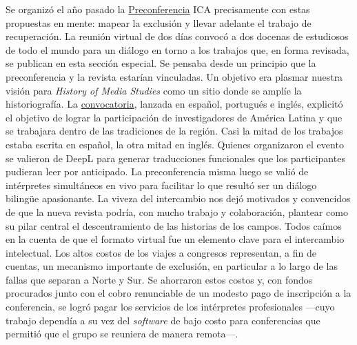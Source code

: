 \documentclass{tufte-handout}
\begin{document}
Se organizó el año pasado la
\href{https://hms.mediastudies.press/pub/schedule/}{Preconferencia} ICA
precisamente con estas propuestas en mente: mapear la exclusión y llevar
adelante el trabajo de recuperación. La reunión virtual de dos días
convocó a dos docenas de estudiosos de todo el mundo para un diálogo en
torno a los trabajos que, en forma revisada, se publican en esta sección
especial. Se pensaba desde un principio que la preconferencia y la
revista estarían vinculadas. Un objetivo era plasmar nuestra visión para
\emph{History of Media Studies} como un sitio donde se amplíe la
historiografía. La
\href{https://hms.mediastudies.press/pub/precon-cfp/}{convocatoria},
lanzada en español, portugués e inglés, explicitó el objetivo de lograr
la participación de investigadores de América Latina y que se trabajara
dentro de las tradiciones de la región. Casi la mitad de los trabajos
estaba escrita en español, la otra mitad en inglés. Quienes organizaron
el evento se valieron de DeepL para generar traducciones funcionales que
los participantes pudieran leer por anticipado. La preconferencia misma
luego se valió de intérpretes simultáneos en vivo para facilitar lo que
resultó ser un diálogo bilingüe apasionante. La viveza del intercambio
nos dejó motivados y convencidos de que la nueva revista podría, con
mucho trabajo y colaboración, plantear como su pilar central el
descentramiento de las historias de los campos. Todos caímos en la
cuenta de que el formato virtual fue un elemento clave para el
intercambio intelectual. Los altos costos de los viajes a congresos
representan, a fin de cuentas, un mecanismo importante de exclusión, en
particular a lo largo de las fallas que separan a Norte y Sur. Se
ahorraron estos costos y, con fondos procurados junto con el cobro
renunciable de un modesto pago de inscripción a la conferencia, se logró
pagar los servicios de los intérpretes profesionales ---cuyo trabajo
dependía a su vez del \emph{software} de bajo costo para conferencias
que permitió que el grupo se reuniera de manera remota---.
\end{document}
